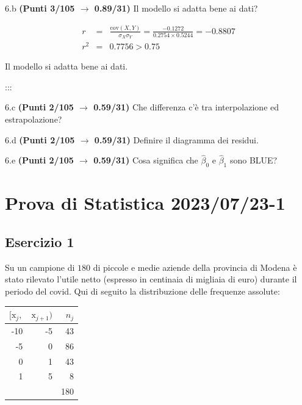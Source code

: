\documentclass[
  11pt,
]{book}
\theoremstyle{mytheoremstyle}
\theoremstyle{mydefstyle}
\newenvironment{sol}
  {
  \begin{tcolorbox}[enhanced,breakable,arc=0.1mm,boxrule=1pt,colback=white,colframe=iblue,
  title=\bf \fontfamily{lmss}\selectfont \hspace{.5 cm} Soluzione,drop fuzzy shadow]

}{
\end{tcolorbox}
  }
\begin{document}
6.b \textbf{(Punti 3/105 \(\rightarrow\) 0.89/31)} Il modello si adatta bene ai dati?

\begin{sol}
\begin{eqnarray*}
r&=&\frac{\text{cov}(X,Y)}{\sigma_X\sigma_Y}=\frac{ -0.1272 }{ 0.2754 \times 0.5244 }= -0.8807 \\ 
r^2&=& 0.7756 > 0.75
\end{eqnarray*}

Il modello si adatta bene ai dati.

\end{sol}

:::

6.c \textbf{(Punti 2/105 \(\rightarrow\) 0.59/31)} Che differenza c'è tra interpolazione ed estrapolazione?

6.d \textbf{(Punti 2/105 \(\rightarrow\) 0.59/31)} Definire il diagramma dei residui.

6.e \textbf{(Punti 2/105 \(\rightarrow\) 0.59/31)} Cosa significa che \(\hat\beta_0\) e \(\hat\beta_1\) sono BLUE?

\section{Prova di Statistica 2023/07/23-1}\label{prova-di-statistica-20230723-1}

\subsection{Esercizio 1}\label{esercizio-1-31}

Su un campione di \(180\) di piccole e medie aziende della provincia di Modena è stato rilevato l'utile netto (espresso in centinaia di migliaia di euro) durante il periodo del covid. Qui di seguito la distribuzione delle frequenze assolute:

\begin{table}[H]
\centering
\begin{tabular}{rrr}
\toprule
$[\text{x}_j,$ & $\text{x}_{j+1})$ & $n_j$\\
\midrule
-10 & -5 & 43\\
-5 & 0 & 86\\
0 & 1 & 43\\
1 & 5 & 8\\
 &  & 180\\
\bottomrule
\end{tabular}
\end{table}
\end{document}
